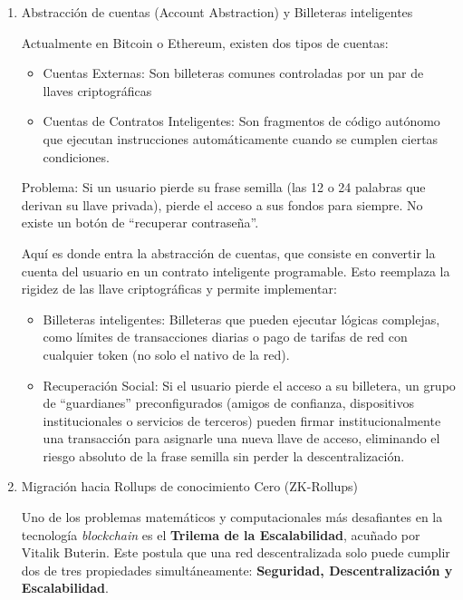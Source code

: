 \documentclass[12pt,a4paper]{article}
\begin{document}
\begin{enumerate}[label=\alph*.]
  \item Abstracción de cuentas (Account Abstraction) y Billeteras inteligentes

Actualmente en Bitcoin o Ethereum, existen dos tipos de cuentas:

\begin{itemize}
  \item Cuentas Externas: Son billeteras comunes controladas por un par de llaves criptográficas
  \item Cuentas de Contratos Inteligentes: Son fragmentos de código autónomo que ejecutan instrucciones automáticamente cuando se cumplen ciertas condiciones.
\end{itemize}

Problema: Si un usuario pierde su frase semilla (las 12 o 24 palabras que derivan su llave privada), pierde el acceso a sus fondos para siempre. No existe un botón de ``recuperar contraseña''.

Aquí es donde entra la abstracción de cuentas, que consiste en convertir la cuenta del usuario en un contrato inteligente programable. Esto reemplaza la rigidez de las llave criptográficas y permite implementar:

\begin{itemize}
  \item Billeteras inteligentes: Billeteras que pueden ejecutar lógicas complejas, como límites de transacciones diarias o pago de tarifas de red con cualquier token (no solo el nativo de la red).
  \item Recuperación Social: Si el usuario pierde el acceso a su billetera, un grupo de ``guardianes'' preconfigurados (amigos de confianza, dispositivos institucionales o servicios de terceros) pueden firmar institucionalmente una transacción para asignarle una nueva llave de acceso, eliminando el riesgo absoluto de la frase semilla sin perder la descentralización.
\end{itemize}

  \item Migración hacia Rollups de conocimiento Cero (ZK-Rollups)

Uno de los problemas matemáticos y computacionales más desafiantes en la tecnología \textit{blockchain} es el \textbf{Trilema de la Escalabilidad}, acuñado por Vitalik Buterin. Este postula que una red descentralizada solo puede cumplir dos de tres propiedades simultáneamente: \textbf{Seguridad, Descentralización y Escalabilidad}.


\end{enumerate}
\end{document}
